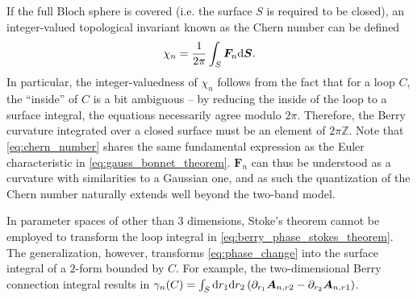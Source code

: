 If the full Bloch sphere is covered (i.e. the surface $S$ is required to be closed), an integer-valued topological invariant known as the Chern number can be defined~\cite{Nakahara1990}
\begin{align}
    \chi_n = \frac1{2\pi}\int_S {\bm F_n} \mathrm d{\bm S}.
    \label{eq:chern_number}
\end{align}
In particular, the integer-valuedness of $\chi_n$ follows from the fact that for a loop $C$, the ``inside'' of $C$ is a bit ambiguous -- by reducing the inside of the loop to a surface integral, the equations necessarily agree modulo $2\pi$.
Therefore, the Berry curvature integrated over a closed surface must be an element of $2\pi \mathds Z$.
Note that \cref{eq:chern_number} shares the same fundamental expression as the Euler characteristic in \cref{eq:gauss_bonnet_theorem}.
$\bm F_n$ can thus be understood as a curvature with similarities to a Gaussian one, and as such the quantization of the Chern number naturally extends well beyond the two-band model.

In parameter spaces of other than $3$ dimensions, Stoke's theorem cannot be employed to transform the loop integral in \cref{eq:berry_phase_stokes_theorem}.
The generalization, however, transforms \cref{eq:phase_change} into the surface integral of a $2$-form bounded by $C$.
For example, the two-dimensional Berry connection integral results in $\gamma_n(C) = \int_S\mathrm d r_1\mathrm d r_2 \left( \partial_{r_1}{\bm A}_{n,r2} - \partial_{r_2}{\bm A}_{n,r1} \right)$.
%
%
